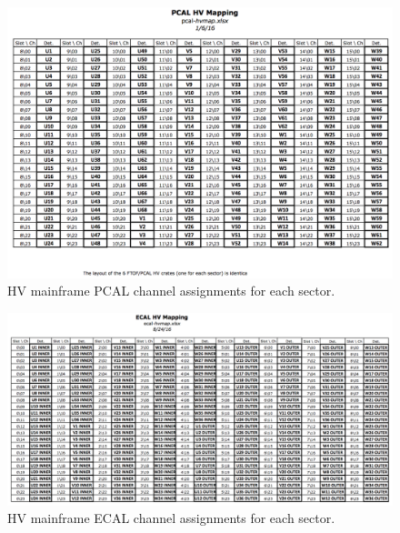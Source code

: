 \documentclass[letterpaper,10pt]{article}
\begin{document}
\begin{figure}
  \hspace{1cm}  \includegraphics[width=9in]{pcal-hv-map}
\caption{HV mainframe PCAL channel assignments for each sector.}
\label{pcal-hv-map}
\end{figure}
\begin{figure}
  \hspace{1cm}
  \includegraphics[width=9in]{ecal-hv-map}
\caption{HV mainframe ECAL channel assignments for each sector.}
\label{ecal-hv-map}
\end{figure}

\newpage
\end{document}
